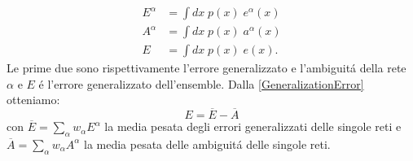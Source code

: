 \documentclass[a4paper,12pt]{report}
\begin{document}
  \begin{align}
   E^{\alpha} &= \int dx \; p\left(x\right) \; e^{\alpha}\left(x\right) \\
   A^{\alpha} &= \int dx \; p\left(x\right) \; a^{\alpha}\left(x\right) \\
   E &= \int dx \; p\left(x\right) \; e\left(x\right).
  \end{align}
  Le prime due sono rispettivamente l'errore generalizzato e l'ambiguit\'a della rete $\alpha$ e $E$ \'e l'errore generalizzato dell'ensemble. 
  Dalla \ref{GeneralizationError} otteniamo:
  \begin{equation}
   E = \overline{E} - \overline{A} \label{EnsembleGeneralizationError}
  \end{equation}
  con $\overline{E} = \sum_{\alpha} w_{\alpha} E^{\alpha}$ la media pesata degli errori generalizzati delle singole reti e $\overline{A} = \sum_{\alpha} w_{\alpha} A^{\alpha}$ la media pesata delle ambiguit\'a delle singole reti.
  
\end{document}
